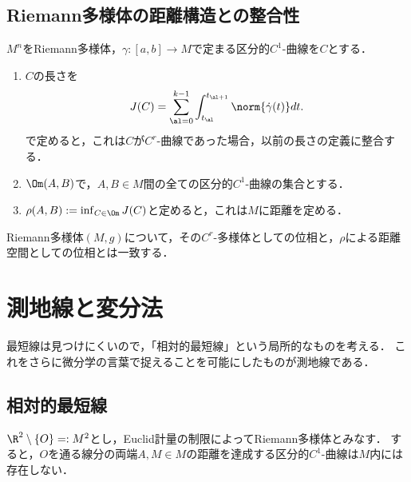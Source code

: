 \documentclass[uplatex,dvipdfmx]{jsreport}
\begin{document}
\subsection{Riemann多様体の距離構造との整合性}

\begin{definition}
    $M^n$をRiemann多様体，$\gamma:[a,b]\to M$で定まる区分的$C^1$-曲線を$C$とする．
    \begin{enumerate}
        \item $C$の長さを
        \[J(C)=\sum_{\al=0}^{k-1}\int^{t_{\al+1}}_{t_\al}\norm{\dot{\gamma}(t)}dt.\]
        で定めると，これは$C$が$C^r$-曲線であった場合，以前の長さの定義に整合する．
        \item $\Om(A,B)$で，$A,B\in  M$間の全ての区分的$C^1$-曲線の集合とする．
        \item $\rho(A,B):=\inf_{C\in\Om}J(C)$と定めると，これは$M$に距離を定める．
    \end{enumerate}
\end{definition}

\begin{theorem}
    Riemann多様体$(M,g)$について，その$C^r$-多様体としての位相と，$\rho$による距離空間としての位相とは一致する．
\end{theorem}

\section{測地線と変分法}

\begin{tcolorbox}[colframe=ForestGreen, colback=ForestGreen!10!white,breakable,colbacktitle=ForestGreen!40!white,coltitle=black,fonttitle=\bfseries\sffamily,
title=]
    最短線は見つけにくいので，「相対的最短線」という局所的なものを考える．
    これをさらに微分学の言葉で捉えることを可能にしたものが測地線である．
\end{tcolorbox}

\subsection{相対的最短線}

\begin{example}[距離を定義した下限は達成されるとは限らない]
    $\R^2\setminus\{O\}=:M^2$とし，Euclid計量の制限によってRiemann多様体とみなす．
    すると，$O$を通る線分の両端$A,M\in M$の距離を達成する区分的$C^1$-曲線は$M$内には存在しない．
\end{example}
\end{document}
